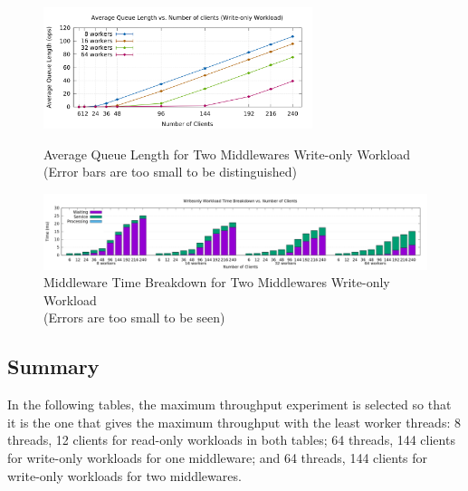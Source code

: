 \begin{figure}[!h]
\centering
\includegraphics[width=0.7\textwidth]{img/3_2_queuelen_writeonly.png}
\captionsetup{justification=centering}
\caption{\label{fig:3.2writeonly_queue}Average Queue Length for Two Middlewares Write-only Workload \\(Error bars are too small to be distinguished)}

\centering
\includegraphics[width=1.0\textwidth]{img/3_2_breakdown_writeonly.png}
\captionsetup{justification=centering}
\caption{\label{fig:3.2writeonly_breakdown}Middleware Time Breakdown for Two Middlewares Write-only Workload \\(Errors are too small to be seen)}
\end{figure}


\subsection{Summary}

In the following tables, the maximum throughput experiment is selected so that it is the one that gives the maximum throughput with the least worker threads: 8 threads, 12 clients for read-only workloads in both tables; 64 threads, 144 clients for write-only workloads for one middleware; and 64 threads, 144 clients for write-only workloads for two middlewares.

